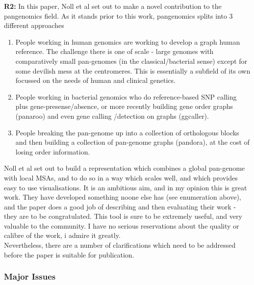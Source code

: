 \documentclass[aps,rmp,onecolumn]{revtex4-1}
\newcommand{\reviewer}[2]{\textbf{#1:} #2\vskip 5mm}
\begin{document}
\reviewer{R2}{In this paper, Noll et al set out to make a novel contribution to the pangenomics field. As it stands prior to this work, pangenomics splits into 3 different approaches

      \begin{enumerate}
            \item People working in human genomics are working to develop a graph human reference. The challenge there is one of scale - large genomes with comparatively small pan-genomes (in the classical/bacterial sense) except for some devilish mess at the centromeres. This is essentially a subfield of its own focussed on the needs of human and clinical genetics.

            \item People working in bacterial genomics who do reference-based SNP calling plus gene-presense/absence, or more recently building gene order graphs (panaroo) and even gene calling /detection on graphs (ggcaller).

            \item People breaking the pan-genome up into a collection of orthologous blocks and then building a collection of pan-genome graphs (pandora), at the cost of losing order information.
      \end{enumerate}


      Noll et al set out to build a representation which combines a global pan-genome with local MSAs, and to do so in a way which scales well, and which provides easy to use visualisations. It is an ambitious aim, and in my opinion this is great work. They have developed something noone else has (see enumeration above), and the paper does a good job of describing and then evaluating their work - they are to be congratulated. This tool is sure to be extremely useful, and very valuable to the community. I have no serious reservations about the quality or calibre of the work, i admire it greatly.\\

      Nevertheless, there are a number of clarifications which need to be addressed before the paper is suitable for publication.}

\subsubsection*{Major Issues}
\end{document}
